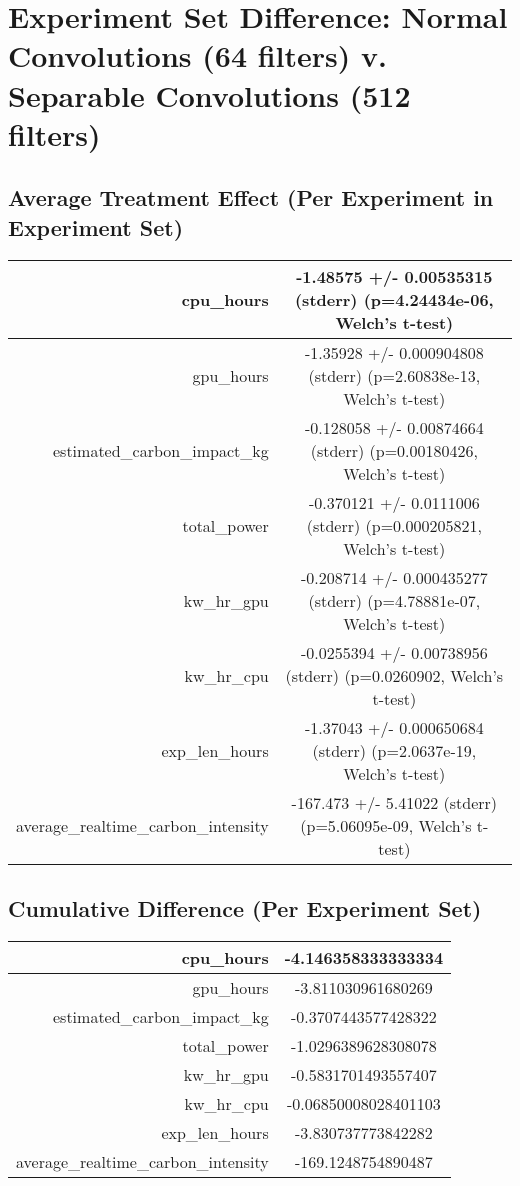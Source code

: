 \documentclass{article}%
\begin{document}
%
\normalsize%
\section{Experiment Set Difference: Normal Convolutions (64 filters) v. Separable Convolutions (512 filters)}%
\label{sec:Experiment Set Difference Normal Convolutions (64 filters) v. Separable Convolutions (512 filters)}%
\subsection{Average Treatment Effect (Per Experiment in Experiment Set)}%
\label{subsec:Average Treatment Effect (Per Experiment in Experiment Set)}%
\begin{tabular}{|r|c|}%
\hline%
cpu\_hours&{-}1.48575 +/{-} 0.00535315 (stderr) (p=4.24434e{-}06, Welch's t{-}test)\\%
\hline%
gpu\_hours&{-}1.35928 +/{-} 0.000904808 (stderr) (p=2.60838e{-}13, Welch's t{-}test)\\%
\hline%
estimated\_carbon\_impact\_kg&{-}0.128058 +/{-} 0.00874664 (stderr) (p=0.00180426, Welch's t{-}test)\\%
\hline%
total\_power&{-}0.370121 +/{-} 0.0111006 (stderr) (p=0.000205821, Welch's t{-}test)\\%
\hline%
kw\_hr\_gpu&{-}0.208714 +/{-} 0.000435277 (stderr) (p=4.78881e{-}07, Welch's t{-}test)\\%
\hline%
kw\_hr\_cpu&{-}0.0255394 +/{-} 0.00738956 (stderr) (p=0.0260902, Welch's t{-}test)\\%
\hline%
exp\_len\_hours&{-}1.37043 +/{-} 0.000650684 (stderr) (p=2.0637e{-}19, Welch's t{-}test)\\%
\hline%
average\_realtime\_carbon\_intensity&{-}167.473 +/{-} 5.41022 (stderr) (p=5.06095e{-}09, Welch's t{-}test)\\%
\hline%
\end{tabular}

%
\subsection{Cumulative Difference (Per Experiment Set)}%
\label{subsec:Cumulative Difference (Per Experiment Set)}%
\begin{tabular}{|r|c|}%
\hline%
cpu\_hours&{-}4.146358333333334\\%
\hline%
gpu\_hours&{-}3.811030961680269\\%
\hline%
estimated\_carbon\_impact\_kg&{-}0.3707443577428322\\%
\hline%
total\_power&{-}1.0296389628308078\\%
\hline%
kw\_hr\_gpu&{-}0.5831701493557407\\%
\hline%
kw\_hr\_cpu&{-}0.06850008028401103\\%
\hline%
exp\_len\_hours&{-}3.830737773842282\\%
\hline%
average\_realtime\_carbon\_intensity&{-}169.1248754890487\\%
\hline%
\end{tabular}

%
\end{document}

